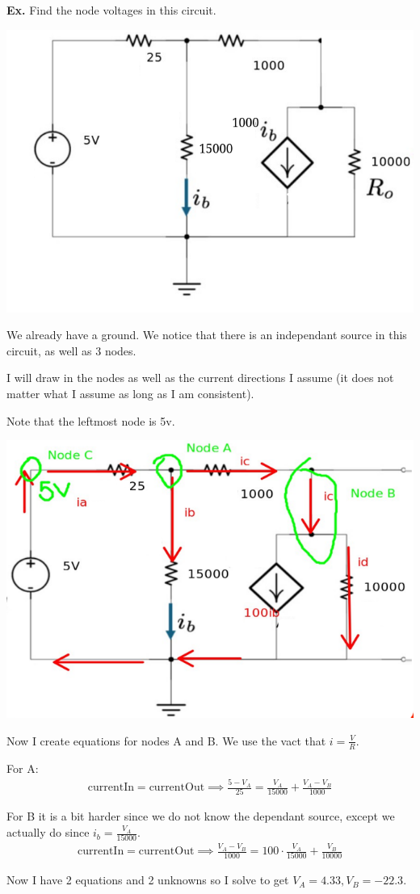 \documentclass[12pt,letterpaper]{article} \usepackage{amsmath} \usepackage{graphicx} \usepackage[margin=1in]{geometry} \usepackage{longtable}  \usepackage{amssymb}
\begin{document}
	\begin{mdframed}[]
	\textbf{Ex.} Find the node voltages in this circuit. 
	\begin{center}
		\includegraphics[width=0.5\linewidth]{ex2}
	\end{center}

	We already have a ground. We notice that there is an independant source in this circuit, as well as 3 nodes. 
	
	I will draw in the nodes as well as the current directions I assume (it does not matter what I assume as long as I am consistent).
	
	Note that the leftmost node is 5v. 
	\begin{center}
		\includegraphics[width=0.5\linewidth]{ex2-2}
	\end{center}
	Now I create equations for nodes A and B. We use the vact that $i=\frac{V}{R}$.
	
	For A: 
	\begin{align*}
		\text{currentIn}=\text{currentOut} \implies \frac{5-V_A}{25} = \frac{V_A}{15000} + \frac{V_A-V_B}{1000}
	\end{align*}

	For B it is a bit harder since we do not know the dependant source, except we actually do since $i_b = \frac{V_A}{15000}$.
	\begin{align*}
		\text{currentIn}=\text{currentOut} \implies \frac{V_A-V_B}{1000} = 100\cdot \frac{V_A}{15000} + \frac{V_B}{10000}
	\end{align*}

	Now I have 2 equations and 2 unknowns so I solve to get $V_A=4.33, V_B=-22.3$. 
	
	\end{mdframed}
	
\end{document}
